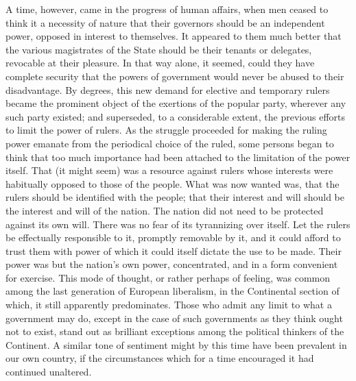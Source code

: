 \documentclass[12pt]{report}
\begin{document}
A time, however, came in the progress of human affairs, when men ceased to think it a necessity of nature that their governors should be an independent power, opposed in interest to themselves. It appeared to them much better that the various magistrates of the State should be their tenants or delegates, revocable at their pleasure. In that way alone, it seemed, could they have complete security that the powers of government would never be abused to their disadvantage. By degrees, this new demand for elective and temporary rulers became the prominent object of the exertions of the popular party, wherever any such party existed; and superseded, to a considerable extent, the previous efforts to limit the power of rulers. As the struggle proceeded for making the ruling power emanate from the periodical choice of the ruled, some persons began to think that too much importance had been attached to the limitation of the power itself. That (it might seem) was a resource against rulers whose interests were habitually opposed to those of the people. What was now wanted was, that the rulers should be identified with the people; that their interest and will should be the interest and will of the nation. The nation did not need to be protected against its own will. There was no fear of its tyrannizing over itself. Let the rulers be effectually responsible to it, promptly removable by it, and it could afford to trust them with power of which it could itself dictate the use to be made. Their power was but the nation's own power, concentrated, and in a form convenient for exercise. This mode of thought, or rather perhaps of feeling, was common among the last generation of European liberalism, in the Continental section of which, it still apparently predominates. Those who admit any limit to what a government may do, except in the case of such governments as they think ought not to exist, stand out as brilliant exceptions among the political thinkers of the Continent. A similar tone of sentiment might by this time have been prevalent in our own country, if the circumstances which for a time encouraged it had continued unaltered.
\end{document}
